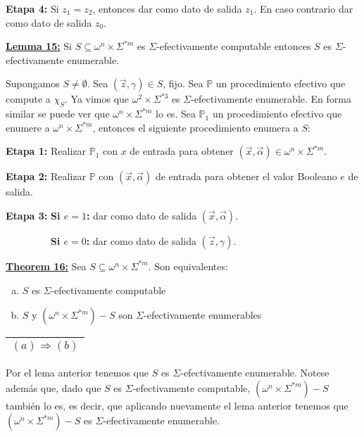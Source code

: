     \textbf{Etapa 4:}
    Si $z_{1} = z_{2}$, entonces dar como dato de salida $z_{1}$. En caso contrario dar como dato de salida $z_{0}$.


  \QED


  \textbf{\underline{Lemma 15:}} Si $S \subseteq \omega^{n} \times \Sigma^{\ast m}$ es $\Sigma$-efectivamente
    computable entonces $S$ es $\Sigma$-efectivamente enumerable.

  \PROOF Supongamos $S \neq \emptyset$. Sea $(\vec{z}, \gamma) \in S$, fijo. Sea $\mathbb{P}$ un procedimiento efectivo
    que compute a $\chi_{S}$. Ya vimos que $\omega^{2} \times \Sigma^{\ast 3}$ es $\Sigma$-efectivamente enumerable. En
    forma similar se puede ver que $\omega^{n} \times \Sigma^{\ast m}$ lo es. Sea $\mathbb{P}_{1}$ un procedimiento
    efectivo que enumere a $\omega^{n} \times \Sigma^{\ast m}$, entonces el siguiente procedimiento enumera a $S$:

    \vspace{3mm}
    \textbf{Etapa 1:}
    Realizar $\mathbb{P}_{1}$ con $x$ de entrada para obtener $(\vec{x}, \vec{\alpha}) \in \omega^{n}\times
    \Sigma^{\ast m}$.

    \textbf{Etapa 2:}
    Realizar $\mathbb{P}$ con $(\vec{x}, \vec{\alpha})$ de entrada para obtener el valor Booleano $e$ de salida.

    \textbf{Etapa 3:}
    \textbf{Si $e=1$:} dar como dato de salida $(\vec{x}, \vec{\alpha})$.

    $\qquad\qquad\;\;$\textbf{Si $e=0$:} dar como dato de salida $(\vec{z}, \gamma)$.

  \QED


  \textbf{\underline{Theorem 16:}} Sea $S \subseteq \omega^{n}\times \Sigma^{\ast m}$. Son equivalentes:

    \begin{enumerate}[a)]
      \item $S$ es $\Sigma$-efectivamente computable
      \item $S$ y $(\omega^{n}\times \Sigma^{\ast m})-S$ son $\Sigma$-efectivamente enumerables
    \end{enumerate}

  \PROOF \begin{tabular}{|c|}\hline $(a) \Rightarrow (b)$\\\hline\end{tabular} Por el lema anterior tenemos que $S$ es
    $\Sigma$-efectivamente enumerable. Notese además que, dado que $S$ es $\Sigma$-efectivamente computable,
    $(\omega^{n} \times \Sigma^{\ast m})-S$ también lo es, es decir, que aplicando nuevamente el lema anterior tenemos
    que $(\omega^{n} \times \Sigma^{\ast m})-S$ es $\Sigma$-efectivamente enumerable.

